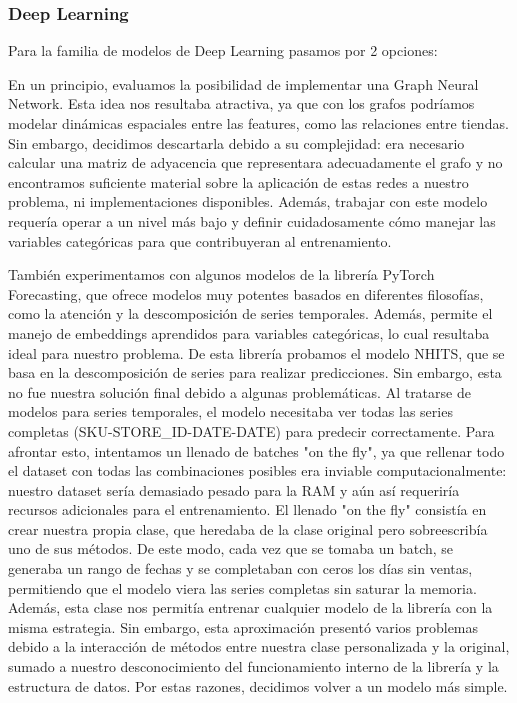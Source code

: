 \documentclass[12pt,a4paper]{article}
\begin{document}
        \subsubsection{Deep Learning}

        Para la familia de modelos de Deep Learning pasamos por 2 opciones:

        \vspace{0.2cm}

        En un principio, evaluamos la posibilidad de implementar una Graph Neural Network. Esta idea nos resultaba atractiva, ya que con los grafos podríamos modelar dinámicas espaciales entre las features, como las relaciones entre tiendas.
        Sin embargo, decidimos descartarla debido a su complejidad: era necesario calcular una matriz de adyacencia que representara adecuadamente el grafo y no encontramos suficiente material sobre la aplicación de estas redes a nuestro problema, ni implementaciones disponibles.
        Además, trabajar con este modelo requería operar a un nivel más bajo y definir cuidadosamente cómo manejar las variables categóricas para que contribuyeran al entrenamiento.

        \vspace{0.2cm}

        También experimentamos con algunos modelos de la librería PyTorch Forecasting, que ofrece modelos muy potentes basados en diferentes filosofías, como la atención y la descomposición de series temporales. Además, permite el manejo de embeddings aprendidos para variables categóricas, lo cual resultaba ideal para nuestro problema.
        De esta librería probamos el modelo NHITS, que se basa en la descomposición de series para realizar predicciones. Sin embargo, esta no fue nuestra solución final debido a algunas problemáticas. Al tratarse de modelos para series temporales, el modelo necesitaba ver todas las series completas (SKU-STORE\_ID-DATE-DATE) para predecir correctamente.  
        Para afrontar esto, intentamos un llenado de batches "on the fly", ya que rellenar todo el dataset con todas las combinaciones posibles era inviable computacionalmente: nuestro dataset sería demasiado pesado para la RAM y aún así requeriría recursos adicionales para el entrenamiento.  
        El llenado "on the fly" consistía en crear nuestra propia clase, que heredaba de la clase original pero sobreescribía uno de sus métodos. De este modo, cada vez que se tomaba un batch, se generaba un rango de fechas y se completaban con ceros los días sin ventas, permitiendo que el modelo viera las series completas sin saturar la memoria. Además, esta clase nos permitía entrenar cualquier modelo de la librería con la misma estrategia.
        Sin embargo, esta aproximación presentó varios problemas debido a la interacción de métodos entre nuestra clase personalizada y la original, sumado a nuestro desconocimiento del funcionamiento interno de la librería y la estructura de datos. Por estas razones, decidimos volver a un modelo más simple.
\end{document}
